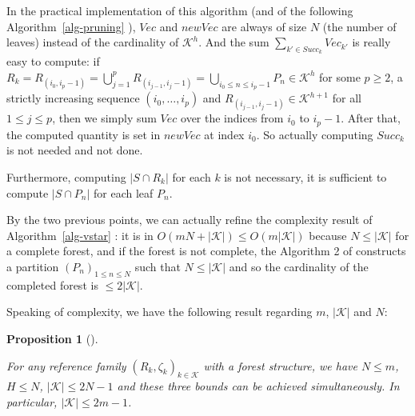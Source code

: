 \documentclass[
  11pt,
  a4paper,
]{article}
\theoremstyle{definition}
\theoremstyle{plain}
\theoremstyle{plain}
\theoremstyle{plain}
\newtheorem{proposition}{Proposition}[section]
\theoremstyle{definition}
\theoremstyle{remark}
\newcounter{quartocallouttipno}
\newcommand{\quartocallouttip}[1]{\refstepcounter{quartocallouttipno}\label{#1}}
\begin{document}
\begin{tcolorbox}[enhanced jigsaw, colframe=quarto-callout-tip-color-frame, coltitle=black, bottomtitle=1mm, breakable, colbacktitle=quarto-callout-tip-color!10!white, title=\textcolor{quarto-callout-tip-color}{\faLightbulb}\hspace{0.5em}{Tip \ref*{tip-algo1} }, toprule=.15mm, opacitybacktitle=0.6, bottomrule=.15mm, leftrule=.75mm, colback=white, toptitle=1mm, opacityback=0, left=2mm, arc=.35mm, rightrule=.15mm, titlerule=0mm]

\quartocallouttip{tip-algo1} 

In the practical implementation of this algorithm (and of the following
 Algorithm~\ref{alg-pruning} ), \(Vec\) and \(newVec\) are always of
size \(N\) (the number of leaves) instead of the cardinality of
\(\mathcal{K}^h\). And the sum \(\sum_{k'\in Succ_k} Vec_{k'}\) is
really easy to compute: if
\(R_k= R_{(i_0,i_{p}-1)}= \bigcup_{ j=1}^{p} R_{(i_{ j-1}, i_{ j}-1)}=\bigcup_{i_0\leq n\leq i_{p}-1}P_n\in\mathcal{K}^h\)
for some \(p\geq2\), a strictly increasing sequence
\((i_0,\dotsc,i_{p})\) and
\(R_{(i_{ j-1}, i_{ j}-1)}\in\mathcal{K}^{h+1}\) for all
\(1\leq j\leq p\), then we simply sum \(Vec\) over the indices from
\(i_{0}\) to \(i_{p}-1\). After that, the computed quantity is set in
\(newVec\) at index \(i_0\). So actually computing \(Succ_k\) is not
needed and not done.

Furthermore, computing \(|S\cap R_k|\) for each \(k\) is not necessary,
it is sufficient to compute \(|S\cap P_n|\) for each leaf \(P_n\).

By the two previous points, we can actually refine the complexity result
of  Algorithm~\ref{alg-vstar} : it is in
\(O(mN+|\mathcal{K}|)\leq O(m|\mathcal{K}|)\) because
\(N\leq|\mathcal{K}|\) for a complete forest, and if the forest is not
complete, the Algorithm 2 of \citet{MR4178188} constructs a partition
\((P_n)_{1\leq n\leq N}\) such that \(N\leq|\mathcal{K}|\) and so the
cardinality of the completed forest is \(\leq 2|\mathcal{K}|\).

\end{tcolorbox}

Speaking of complexity, we have the following result regarding \(m\),
\(|\mathcal{K}|\) and \(N\):

\begin{proposition}[]\protect\hypertarget{prp-cardinals}{}\label{prp-cardinals}

For any reference family \((R_k,\zeta_k)_{k\in\mathcal{K}}\) with a
forest structure, we have \(N\leq m\), \(H\leq N\),
\(|\mathcal{K}|\leq 2N-1\) and these three bounds can be achieved
simultaneously. In particular, \(|\mathcal{K}|\leq 2m-1\).

\end{proposition}
\end{document}
